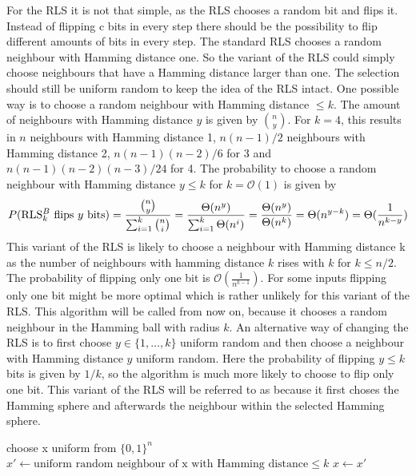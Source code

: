 For the RLS it is not that simple, as the RLS chooses a random bit and flips it.
Instead of flipping c bits in every step there should be the possibility to flip different amounts of bits in every step.
The standard RLS chooses a random neighbour with Hamming distance one.
So the variant of the RLS could simply choose neighbours that have a Hamming distance larger than one.
The selection should still be uniform random to keep the idea of the RLS intact.
One possible way is to choose a random neighbour with Hamming distance $\le k$.
The amount of neighbours with Hamming distance $y$ is given by $\binom{n}{y}$.
For $k=4$, this results in $n$ neighbours with Hamming distance 1, $n(n-1)/2$ neighbours with Hamming distance 2, $n(n-1)(n-2)/6$ for 3
and $n(n-1)(n-2)(n-3)/24$ for 4.
The probability to choose a random neighbour with Hamming distance $y \le k$ for $k = \mathcal{O}(1)$ is given by
\[P(\text{RLS$^{B}_{k}$}\text{ flips }y\text{ bits}) = \frac{\binom{n}{y}}{\sum_{i=1}^k \binom{n}{i}} = \frac{\Theta(n^y)}{\sum_{i=1}^k \Theta(n^i)}
      = \frac{\Theta(n^y)}{\Theta(n^k)} = \Theta(n^{y-k}) = \Theta(\frac{1}{n^{k-y}})\]
This variant of the RLS is likely to choose a neighbour with Hamming distance k as the number of neighbours with hamming
distance $k$ rises with $k$ for $k \le n/2$.
The probability of flipping only one bit is $\mathcal{O}(\frac{1}{n^{k-1}})$.
For some inputs flipping only one bit might be more optimal which is rather unlikely for this variant of the RLS.
This algorithm will be called \RLSN[k] from now on, because it chooses a random neighbour in the Hamming ball with radius $k$.\newline
An alternative way of changing the RLS is to first choose $y \in \{1, \dots, k\}$ uniform random and then choose a neighbour with Hamming distance $y$ uniform random.
Here the probability of flipping $y \le k$ bits is given by $1/k$, so the algorithm is much more likely to choose to flip only one bit.
This variant of the RLS will be referred to as \RLSR[k] because it first choses the Hamming sphere and afterwards the neighbour within the selected Hamming sphere.

\begin{algorithm}[bt]
      \caption{\textsc{\RLSN}}\label{alg:rlsN}

      \DontPrintSemicolon %

      \BlankLine
      choose x uniform from ${\{0,1\}}^n$\;
      {
      $x' \leftarrow \text{uniform random neighbour of x with Hamming distance} \le k$\;
      {
      {
            $x \leftarrow x'$\;
      }
      }
      }
\end{algorithm}

